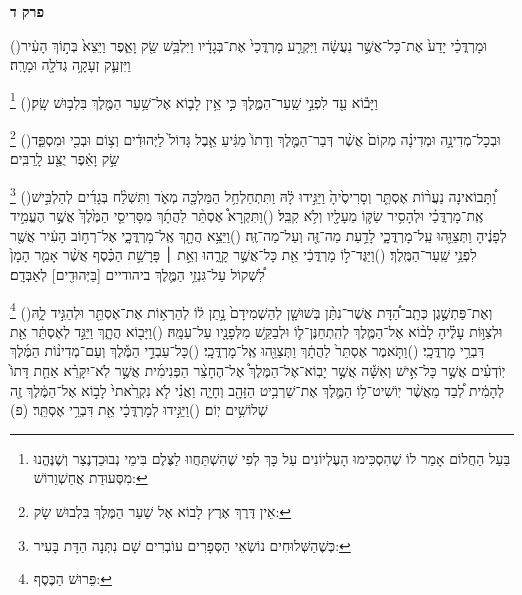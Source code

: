 \documentclass[12pt, openany]{book}
\newcommand{\chapname}{}
\newcommand{\newchap}[1]{
	\addcontentsline{toc}{chapter}{#1}
	\renewcommand{\chapname}{#1}
		\begin{center}
			\textbf{%
\fontsize{16pt}{16pt}\selectfont
				#1}
		\end{center}
}
\newcommand{\footnotecomment}[1]{
	\renewcommand\thefootnote{}
	\footnote{\textsf{#1}}}
\newcommand{\commenta}[1]{\footnotecomment{#1}\hspace{0em}}
\newcommand{\vsnum}[1]{(\hebrewnumeral{#1})\space}
\begin{document}
\newchap{פרק ד}
\begin{multicols}{2}
\vsnum{1}וּמָרְדֳּכַ֗י יָדַע֙ אֶת־כָּל־אֲשֶׁ֣ר נַעֲשָׂ֔ה וַיִּקְרַ֤ע מָרְדֳּכַי֙ אֶת־בְּגָדָ֔יו וַיִּלְבַּ֥שׁ שַׂ֖ק וָאֵ֑פֶר וַיֵּצֵא֙ בְּת֣וֹךְ הָעִ֔יר וַיִּזְעַ֛ק זְעָקָ֥ה גְדֹלָ֖ה וּמָרָֽה׃%
\commenta{ בַּעַל הַחֲלוֹם אָמַר לוֹ שֶׁהִסְכִּימוּ הָעֶלְיוֹנִים עַל כָּךְ לְפִי שֶׁהִשְׁתַּחֲווּ לַצֶּלֶם בִּימֵי נְבוּכַדְנֶצַר וְשֶׁנֶּהֱנוּ מִסְּעוּדַת אֲחַשְׁוֵרוֹשׁ:}%
\vsnum{2}וַיָּב֕וֹא עַ֖ד לִפְנֵ֣י שַֽׁעַר־הַמֶּ֑לֶךְ כִּ֣י אֵ֥ין לָב֛וֹא אֶל־שַׁ֥עַר הַמֶּ֖לֶךְ בִּלְב֥וּשׁ שָֽׂק׃%
\commenta{ אֵין דֶּרֶךְ אֶרֶץ לָבוֹא אֶל שַׁעַר הַמֶּלֶךְ בִּלְבוּשׁ שָׂק:}%
\vsnum{3}וּבְכָל־מְדִינָ֣ה וּמְדִינָ֗ה מְקוֹם֙ אֲשֶׁ֨ר דְּבַר־הַמֶּ֤לֶךְ וְדָתוֹ֙ מַגִּ֔יעַ אֵ֤בֶל גָּדוֹל֙ לַיְּהוּדִ֔ים וְצ֥וֹם וּבְכִ֖י וּמִסְפֵּ֑ד שַׂ֣ק וָאֵ֔פֶר יֻצַּ֖ע לָֽרַבִּֽים׃%
\commenta{ כְּשֶׁהַשְּׁלוּחִים נוֹשְׂאֵי הַסְּפָרִים עוֹבְרִים שָׁם נִתְּנָה הַדָּת בָּעִיר:}%
\vsnum{4}וַ֠תָּבוֹאינָה נַעֲר֨וֹת אֶסְתֵּ֤ר וְסָרִיסֶ֙יהָ֙ וַיַּגִּ֣ידוּ לָ֔הּ וַתִּתְחַלְחַ֥ל הַמַּלְכָּ֖ה מְאֹ֑ד וַתִּשְׁלַ֨ח בְּגָדִ֜ים לְהַלְבִּ֣ישׁ אֶֽת־מָרְדֳּכַ֗י וּלְהָסִ֥יר שַׂקּ֛וֹ מֵעָלָ֖יו וְלֹ֥א קִבֵּֽל׃
\vsnum{5}וַתִּקְרָא֩ אֶסְתֵּ֨ר לַהֲתָ֜ךְ מִסָּרִיסֵ֤י הַמֶּ֙לֶךְ֙ אֲשֶׁ֣ר הֶעֱמִ֣יד לְפָנֶ֔יהָ וַתְּצַוֵּ֖הוּ עַֽל־מָרְדֳּכָ֑י לָדַ֥עַת מַה־זֶּ֖ה וְעַל־מַה־זֶּֽה׃
\vsnum{6}וַיֵּצֵ֥א הֲתָ֖ךְ אֶֽל־מָרְדֳּכָ֑י אֶל־רְח֣וֹב הָעִ֔יר אֲשֶׁ֖ר לִפְנֵ֥י שַֽׁעַר־הַמֶּֽלֶךְ׃
\vsnum{7}וַיַּגֶּד־ל֣וֹ מָרְדֳּכַ֔י אֵ֖ת כָּל־אֲשֶׁ֣ר קָרָ֑הוּ וְאֵ֣ת ׀ פָּרָשַׁ֣ת הַכֶּ֗סֶף אֲשֶׁ֨ר אָמַ֤ר הָמָן֙ לִ֠שְׁקוֹל עַל־גִּנְזֵ֥י הַמֶּ֛לֶךְ ביהודיים [בַּיְּהוּדִ֖ים] לְאַבְּדָֽם׃%
\commenta{ פֵּרוּשׁ הַכֶּסֶף:}%
\vsnum{8}וְאֶת־פַּתְשֶׁ֣גֶן כְּתָֽב־הַ֠דָּת אֲשֶׁר־נִתַּ֨ן בְּשׁוּשָׁ֤ן לְהַשְׁמִידָם֙ נָ֣תַן ל֔וֹ לְהַרְא֥וֹת אֶת־אֶסְתֵּ֖ר וּלְהַגִּ֣יד לָ֑הּ וּלְצַוּ֣וֹת עָלֶ֗יהָ לָב֨וֹא אֶל־הַמֶּ֧לֶךְ לְהִֽתְחַנֶּן־ל֛וֹ וּלְבַקֵּ֥שׁ מִלְּפָנָ֖יו עַל־עַמָּֽהּ׃
\vsnum{9}וַיָּב֖וֹא הֲתָ֑ךְ וַיַּגֵּ֣ד לְאֶסְתֵּ֔ר אֵ֖ת דִּבְרֵ֥י מָרְדֳּכָֽי׃
\vsnum{10}וַתֹּ֤אמֶר אֶסְתֵּר֙ לַהֲתָ֔ךְ וַתְּצַוֵּ֖הוּ אֶֽל־מָרְדֳּכָֽי׃
\vsnum{11}כָּל־עַבְדֵ֣י הַמֶּ֡לֶךְ וְעַם־מְדִינ֨וֹת הַמֶּ֜לֶךְ יֽוֹדְעִ֗ים אֲשֶׁ֣ר כָּל־אִ֣ישׁ וְאִשָּׁ֡ה אֲשֶׁ֣ר יָבֽוֹא־אֶל־הַמֶּלֶךְ֩ אֶל־הֶחָצֵ֨ר הַפְּנִימִ֜ית אֲשֶׁ֣ר לֹֽא־יִקָּרֵ֗א אַחַ֤ת דָּתוֹ֙ לְהָמִ֔ית לְ֠בַד מֵאֲשֶׁ֨ר יֽוֹשִׁיט־ל֥וֹ הַמֶּ֛לֶךְ אֶת־שַׁרְבִ֥יט הַזָּהָ֖ב וְחָיָ֑ה וַאֲנִ֗י לֹ֤א נִקְרֵ֙אתי֙ לָב֣וֹא אֶל־הַמֶּ֔לֶךְ זֶ֖ה שְׁלוֹשִׁ֥ים יֽוֹם׃
\vsnum{12}וַיַּגִּ֣ידוּ לְמָרְדֳּכָ֔י אֵ֖ת דִּבְרֵ֥י אֶסְתֵּֽר׃ (פ)

\end{multicols}
\end{document}
